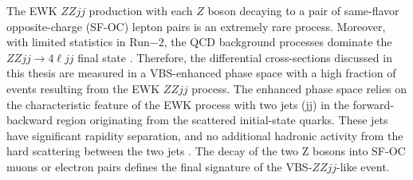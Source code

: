 The EWK $ZZjj$ production with each $Z$ boson decaying to a pair of same-flavor opposite-charge (SF-OC) lepton pairs is an extremely rare process. Moreover, with limited statistics in Run$-2$, the QCD background processes dominate the $ZZjj \rightarrow 4\ell jj$ final state \cite{ATLASZZjj}. Therefore, the differential cross-sections discussed in this thesis are measured in a VBS-enhanced phase space with a high fraction of events resulting from the EWK $ZZjj$ process. The enhanced phase space relies on the characteristic feature of the EWK process with two jets (jj) in the forward-backward region originating from the scattered initial-state quarks. These jets have significant rapidity separation, and no additional hadronic activity from the hard scattering between the two jets \cite{RapidityGapCite}. The decay of the two Z bosons into SF-OC muons or electron pairs defines the final signature of the VBS-$ZZjj$-like event.
